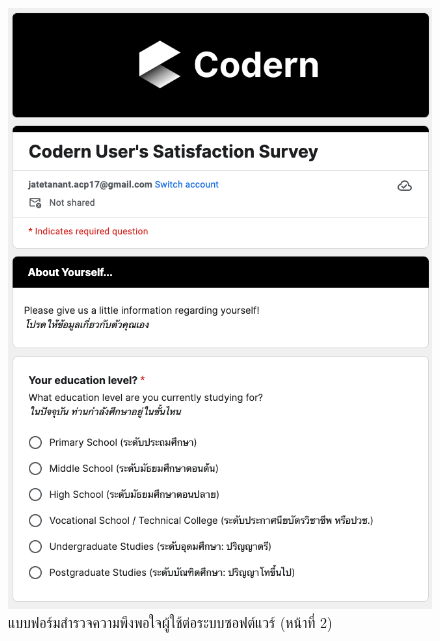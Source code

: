 \documentclass[12pt,one side,openright,a4paper]{cpe-thesis-th}
\begin{document}
\begin{figure}[H]
  \centering
  \includegraphics[width=15cm]{figure/results/forms/survey-google-p2-1.png}
  \caption[แบบฟอร์มสำรวจความพึงพอใจผู้ใช้ต่อระบบซอฟต์แวร์ (หน้าที่ 2)]{แบบฟอร์มสำรวจความพึงพอใจผู้ใช้ต่อระบบซอฟต์แวร์ (หน้าที่ 2)}
\end{figure}
\end{document}
